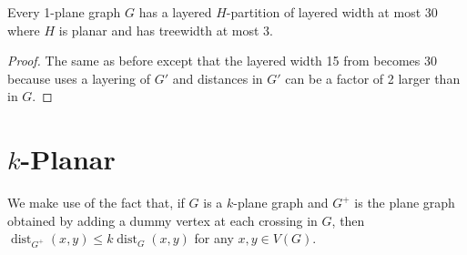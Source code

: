 \documentclass{patmorin}
\DeclareMathOperator{\dist}{dist}
\begin{document}
\begin{thm}
  Every 1-plane graph $G$ has a layered $H$-partition of layered width at most 30 where $H$ is planar and has treewidth at most 3.
\end{thm}

\begin{proof}
  The same as before except that the layered width 15 from  becomes 30 because  uses a layering of $G'$ and distances in $G'$ can be a factor of 2 larger than in $G$.
\end{proof}


\section{$k$-Planar}

  We make use of the fact that, if $G$ is a $k$-plane graph and $G^+$ is the plane graph obtained by adding a dummy vertex at each crossing in $G$, then $\dist_{G^+}(x,y)\le k\dist_G(x,y)$ for any $x,y\in V(G)$.
\end{document}
